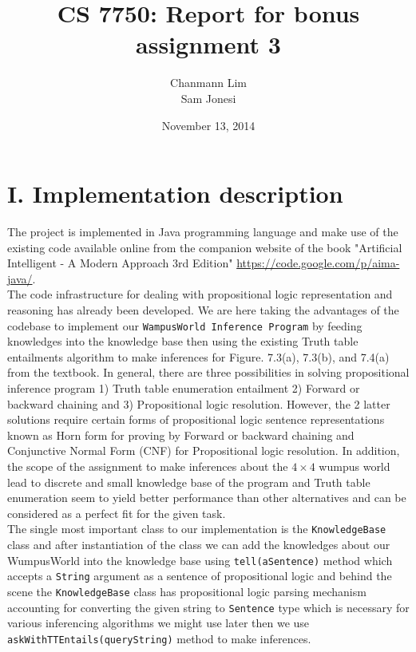 \documentclass[a4paper]{report}
\begin{document}
\title{CS 7750: Report for bonus assignment 3}
\author{Chanmann Lim \\Sam Jonesi}
\date{November 13, 2014}
\maketitle

\lstset{language=Java,title=\lstname,basicstyle=\footnotesize}

\section*{I. Implementation description}

The project is implemented in Java programming language and make use of the existing code available online from the companion website of the book "Artificial Intelligent - A Modern Approach 3rd Edition" \url{https://code.google.com/p/aima-java/}. \\

The code infrastructure for dealing with propositional logic representation and reasoning has already been developed. We are here taking the advantages of the codebase to implement our \texttt{WampusWorld Inference Program} by feeding knowledges into the knowledge base then using the existing Truth table entailments algorithm to make inferences for Figure. 7.3(a), 7.3(b), and 7.4(a) from the textbook. In general, there are three possibilities in solving propositional inference program 1) Truth table enumeration entailment 2) Forward or backward chaining and 3) Propositional logic resolution. However, the 2 latter solutions require certain forms of propositional logic sentence representations known as Horn form for proving by Forward or backward chaining and Conjunctive Normal Form (CNF) for Propositional logic resolution. In addition, the scope of the assignment to make inferences about the $4\times4$ wumpus world lead to discrete and small knowledge base of the program and Truth table enumeration seem to yield better performance than other alternatives and can be considered as a perfect fit for the given task. \\

The single most important class to our implementation is the \texttt{KnowledgeBase} class and after instantiation of the class we can add the knowledges about our WumpusWorld into the knowledge base using \texttt{tell(aSentence)} method which accepts a \texttt{String} argument as a sentence of propositional logic and behind the scene the \texttt{KnowledgeBase} class has propositional logic parsing mechanism accounting for converting the given string to \texttt{Sentence} type which is necessary for various inferencing algorithms we might use later then we use \texttt{askWithTTEntails(queryString)} method to make inferences. \\
\end{document}
